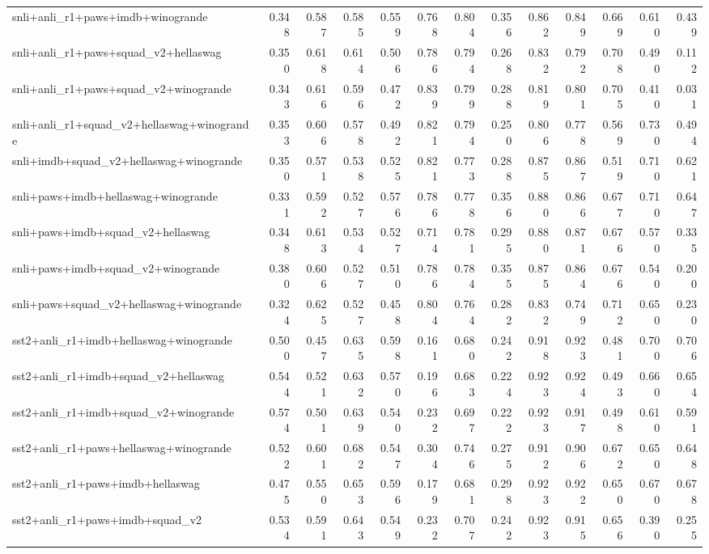 \begin{table}[t]
\begin{tabular}{lrrrrrrrrrrrr}
    snli+anli\_r1+paws+imdb+winogrande & 0.348 & 0.587 & 0.585 & 0.559 & 0.768 & 0.804 & 0.356 & 0.862 & 0.849 & 0.669 & 0.610 & 0.439 \\
    snli+anli\_r1+paws+squad\_v2+hellaswag & 0.350 & 0.618 & 0.614 & 0.506 & 0.786 & 0.794 & 0.268 & 0.832 & 0.792 & 0.708 & 0.490 & 0.112 \\
    snli+anli\_r1+paws+squad\_v2+winogrande & 0.343 & 0.616 & 0.596 & 0.472 & 0.839 & 0.799 & 0.288 & 0.819 & 0.801 & 0.705 & 0.410 & 0.031 \\
    snli+anli\_r1+squad\_v2+hellaswag+winogrande & 0.353 & 0.606 & 0.578 & 0.492 & 0.821 & 0.794 & 0.250 & 0.806 & 0.778 & 0.569 & 0.730 & 0.494 \\
    snli+imdb+squad\_v2+hellaswag+winogrande & 0.350 & 0.571 & 0.538 & 0.525 & 0.821 & 0.773 & 0.288 & 0.875 & 0.867 & 0.519 & 0.710 & 0.621 \\
    snli+paws+imdb+hellaswag+winogrande & 0.331 & 0.592 & 0.527 & 0.576 & 0.786 & 0.778 & 0.356 & 0.880 & 0.866 & 0.677 & 0.710 & 0.647 \\
    snli+paws+imdb+squad\_v2+hellaswag & 0.348 & 0.613 & 0.534 & 0.527 & 0.714 & 0.781 & 0.295 & 0.880 & 0.871 & 0.676 & 0.570 & 0.335 \\
    snli+paws+imdb+squad\_v2+winogrande & 0.380 & 0.606 & 0.527 & 0.510 & 0.786 & 0.784 & 0.355 & 0.875 & 0.864 & 0.676 & 0.540 & 0.200 \\
    snli+paws+squad\_v2+hellaswag+winogrande & 0.324 & 0.625 & 0.527 & 0.458 & 0.804 & 0.764 & 0.282 & 0.832 & 0.749 & 0.712 & 0.650 & 0.230 \\
    sst2+anli\_r1+imdb+hellaswag+winogrande & 0.500 & 0.457 & 0.635 & 0.598 & 0.161 & 0.680 & 0.242 & 0.918 & 0.923 & 0.481 & 0.700 & 0.706 \\
    sst2+anli\_r1+imdb+squad\_v2+hellaswag & 0.544 & 0.521 & 0.632 & 0.570 & 0.196 & 0.683 & 0.224 & 0.923 & 0.924 & 0.493 & 0.660 & 0.654 \\
    sst2+anli\_r1+imdb+squad\_v2+winogrande & 0.574 & 0.501 & 0.639 & 0.540 & 0.232 & 0.697 & 0.222 & 0.923 & 0.917 & 0.498 & 0.610 & 0.591 \\
    sst2+anli\_r1+paws+hellaswag+winogrande & 0.522 & 0.601 & 0.682 & 0.547 & 0.304 & 0.746 & 0.275 & 0.912 & 0.906 & 0.672 & 0.650 & 0.648 \\
    sst2+anli\_r1+paws+imdb+hellaswag & 0.475 & 0.550 & 0.653 & 0.596 & 0.179 & 0.681 & 0.298 & 0.923 & 0.922 & 0.650 & 0.670 & 0.678 \\
    sst2+anli\_r1+paws+imdb+squad\_v2 & 0.534 & 0.591 & 0.643 & 0.549 & 0.232 & 0.707 & 0.242 & 0.923 & 0.915 & 0.656 & 0.390 & 0.255 \\

\end{tabular}
\end{table}
